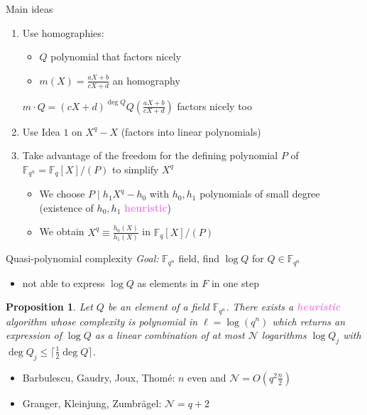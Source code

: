 \documentclass[xcolor=x11names,compress]{beamer}
\theoremstyle{break}
\newtheorem{prop}[thm]{Proposition}
\theoremstyle{sc}
\theoremstyle{definition}
\theoremstyle{remark}
\begin{document}
\begin{frame}{Main ideas}
  \begin{enumerate}
    \item Use homographies:
      \begin{itemize}
        \item $Q$ polynomial that factors nicely
        \item $m(X) = \frac{aX+b}{cX+d}$ an homography
      \end{itemize}
      $m\cdot Q = (cX+d)^{\deg Q}Q(\frac{aX+b}{cX+d})$ factors nicely too
      \newline
    \item Use Idea $1$ on $X^q-X$ (factors into linear polynomials)
      \newline
    \item Take advantage of the freedom for the defining polynomial $P$ of
      $\mathbb{F}_{q^n}=\mathbb{F}_q[X]/(P)$ to simplify $X^q$
      \begin{itemize}
        \item We choose $P\;|\;h_1X^q-h_0$ with $h_0, h_1$ polynomials of small
          degree (existence of $h_0, h_1$
          \textcolor{violet}{\textbf{heuristic}})
        \item We obtain $X^q \equiv \frac{h_0(X)}{h_1(X)}$ in
          $\mathbb{F}_q[X]/(P)$
      \end{itemize}
  \end{enumerate}
\end{frame}

\begin{frame}{Quasi-polynomial complexity}
  \emph{Goal:} $\mathbb{F}_{q^n}$ field, find $\log Q$ for $Q\in
  \mathbb{F}_{q^n}$ 
  \begin{itemize}
    \item not able to express $\log Q$ as elements in $F$ in one step 
  \end{itemize}
\begin{prop}
  Let $Q$ be an element of a field $\mathbb{F}_{q^n}$. There exists a
  \textcolor{violet}{\textbf{heuristic}} algorithm whose complexity is polynomial in
  $\ell=\log(q^n)$ which returns an expression of $\log Q$ as a linear combination of
  at most $\mathcal N$ logarithms $\log Q_j$ with $\deg Q_j\leq \lceil
  \frac{1}{2}\deg Q\rceil$.
\end{prop}
\begin{itemize}
  \item Barbulescu, Gaudry, Joux, Thomé: $n$ even and $\mathcal
    N=O(q^2 \frac{n}{2})$
  \item Granger, Kleinjung, Zumbrägel: $\mathcal N =
    q+2$
\end{itemize}
\end{frame}
\end{document}
